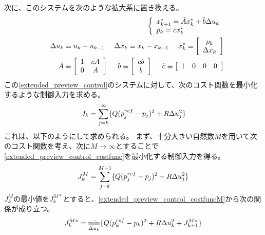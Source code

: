 次に、このシステムを次のような拡大系に置き換える。
\begin{eqnarray}
  && \left\{
  \begin{array}{l}
    x^\ast_{k+1} = \tilde{A} x^\ast_k + \tilde{b} \Delta u_k \\
    p_k = \tilde{c} x^\ast_k
  \end{array}
  \right. \eqlabel{extended_preview_control}\\
  && \Delta u_k \equiv u_k - u_{k-1} ~~~~ \Delta x_k \equiv x_k - x_{k-1} ~~~~ x^\ast_k \equiv \left[
    \begin{array}{c}
      p_k\\
      \Delta x_k
    \end{array}
    \right] \nonumber\\
  && \tilde{A} \equiv \left[
    \begin{array}{c c}
      1 & cA\\
      0 & A
    \end{array}
    \right] ~~~~ \tilde{b} \equiv \left[
    \begin{array}{c}
      cb\\
      b
    \end{array}
    \right] ~~~~ \tilde{c} \equiv \left[
    \begin{array}{c c c c}
      1 & 0 & 0 & 0
    \end{array}
    \right]\nonumber
\end{eqnarray}
この\eqref{extended_preview_control}のシステムに対して、次のコスト関数を最小化するような制御入力を求める。
\begin{eqnarray}
  J_k = \sum_{j=k}^{\infty} \{Q(p_{j}^{ref} - p_{j})^2 + R\Delta u_{j}^2\} \eqlabel{extended_preview_control_costfunc}
\end{eqnarray}
これは、以下のようにして求められる。
まず、十分大きい自然数$M$を用いて次のコスト関数を考え、次に$M \rightarrow \infty$とすることで\eqref{extended_preview_control_costfunc}を最小化する制御入力を得る。
\begin{eqnarray}
  J_k^M = \sum_{j=k}^{M-1} \{Q(p_{j}^{ref} - p_{j})^2 + R\Delta u_{j}^2\} \eqlabel{extended_preview_control_costfuncM}
\end{eqnarray}
$J_k^M$の最小値を$J_k^{M\ast}$とすると、\eqref{extended_preview_control_costfuncM}から次の関係が成り立つ。
\begin{eqnarray}
  J_k^{M\ast} = \min_{\Delta u_k} \{Q(p_k^{ref} - p_k)^2 + R\Delta u_k^2 + J_{k+1}^{M\ast}\}  \eqlabel{extended_preview_control_costfunc2}
\end{eqnarray}
